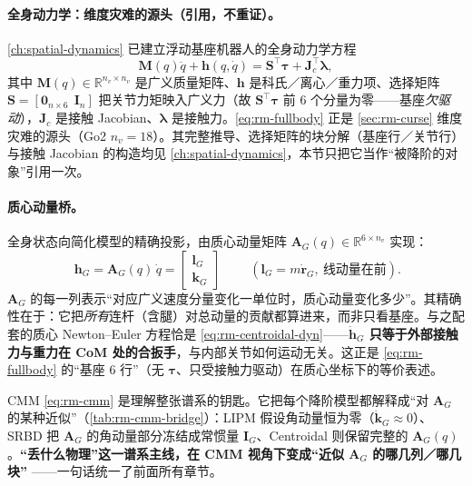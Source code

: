 \paragraph{全身动力学：维度灾难的源头（引用，不重证）。}
\cref{ch:spatial-dynamics} 已建立浮动基座机器人的全身动力学方程
\begin{equation}
  \mathbf{M}(q)\ddot{q}+\mathbf{h}(q,\dot{q})=\mathbf{S}^\top\boldsymbol{\tau}+\mathbf{J}_c^\top\boldsymbol{\lambda},
  \label{eq:rm-fullbody}
\end{equation}
其中 $\mathbf{M}(q)\in\mathbb{R}^{n_v\times n_v}$ 是广义质量矩阵、$\mathbf{h}$ 是科氏／离心／重力项、选择矩阵 $\mathbf{S}=[\mathbf{0}_{n\times 6}\ \ \mathbf{I}_{n}]$ 把关节力矩映入广义力（故 $\mathbf{S}^\top\boldsymbol{\tau}$ 前 $6$ 个分量为零——基座\emph{欠驱动}），$\mathbf{J}_c$ 是接触 Jacobian、$\boldsymbol{\lambda}$ 是接触力。\cref{eq:rm-fullbody} 正是 \cref{sec:rm-curse} 维度灾难的源头（Go2 $n_v=18$）。其完整推导、选择矩阵的块分解（基座行／关节行）与接触 Jacobian 的构造均见 \cref{ch:spatial-dynamics}，本节只把它当作“被降阶的对象”引用一次。

\paragraph{质心动量桥。}
全身状态向简化模型的精确投影，由质心动量矩阵 $\mathbf{A}_G(q)\in\mathbb{R}^{6\times n_v}$ 实现：
\begin{equation}
  \boxed{\;\mathbf{h}_G=\mathbf{A}_G(q)\,\dot{q}=\begin{bmatrix}\mathbf{l}_G\\\mathbf{k}_G\end{bmatrix}\;}
  \qquad(\mathbf{l}_G=m\dot{\mathbf{r}}_G,\ \text{线动量在前}).
  \label{eq:rm-cmm}
\end{equation}
$\mathbf{A}_G$ 的每一列表示“对应广义速度分量变化一单位时，质心动量变化多少”。其精确性在于：它把\emph{所有}连杆（含腿）对总动量的贡献都算进来，而非只看基座。与之配套的质心 Newton–Euler 方程恰是 \cref{eq:rm-centroidal-dyn}——\textbf{$\dot{\mathbf{h}}_G$ 只等于外部接触力与重力在 CoM 处的合扳手}，与内部关节如何运动无关。这正是 \cref{eq:rm-fullbody} 的“基座 $6$ 行”（无 $\boldsymbol{\tau}$、只受接触力驱动）在质心坐标下的等价表述。

\begin{insight}
CMM \cref{eq:rm-cmm} 是理解整张谱系的钥匙。它把每个降阶模型都解释成“对 $\mathbf{A}_G$ 的某种近似”（\cref{tab:rm-cmm-bridge}）：LIPM 假设角动量恒为零（$\dot{\mathbf{k}}_G\approx 0$）、SRBD 把 $\mathbf{A}_G$ 的角动量部分冻结成常惯量 $\mathbf{I}_G$、Centroidal 则保留完整的 $\mathbf{A}_G(q)$。\textbf{“丢什么物理”这一谱系主线，在 CMM 视角下变成“近似 $\mathbf{A}_G$ 的哪几列／哪几块”} ——一句话统一了前面所有章节。
\end{insight}

